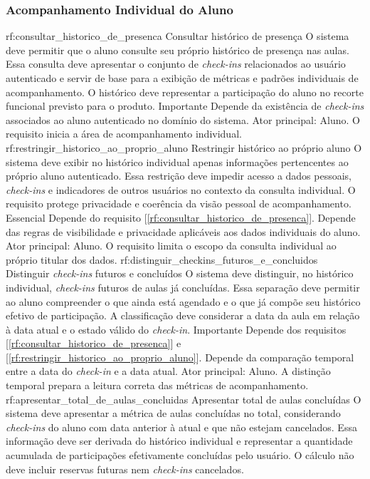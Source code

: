 \subsubsection*{Acompanhamento Individual do Aluno}
\reqfuncfull
{rf:consultar_historico_de_presenca}
{Consultar histórico de presença}
{O sistema deve permitir que o aluno consulte seu próprio histórico de presença nas aulas. Essa consulta deve apresentar o conjunto de \textit{check-ins} relacionados ao usuário autenticado e servir de base para a exibição de métricas e padrões individuais de acompanhamento. O histórico deve representar a participação do aluno no recorte funcional previsto para o produto.}
{Importante}
{Depende da existência de \textit{check-ins} associados ao aluno autenticado no domínio do sistema.}
{Ator principal: Aluno. O requisito inicia a área de acompanhamento individual.}
\reqfuncfull
{rf:restringir_historico_ao_proprio_aluno}
{Restringir histórico ao próprio aluno}
{O sistema deve exibir no histórico individual apenas informações pertencentes ao próprio aluno autenticado. Essa restrição deve impedir acesso a dados pessoais, \textit{check-ins} e indicadores de outros usuários no contexto da consulta individual. O requisito protege privacidade e coerência da visão pessoal de acompanhamento.}
{Essencial}
{Depende do requisito [\ref{rf:consultar_historico_de_presenca}]. Depende das regras de visibilidade e privacidade aplicáveis aos dados individuais do aluno.}
{Ator principal: Aluno. O requisito limita o escopo da consulta individual ao próprio titular dos dados.}
\reqfuncfull
{rf:distinguir_checkins_futuros_e_concluidos}
{Distinguir \textit{check-ins} futuros e concluídos}
{O sistema deve distinguir, no histórico individual, \textit{check-ins} futuros de aulas já concluídas. Essa separação deve permitir ao aluno compreender o que ainda está agendado e o que já compõe seu histórico efetivo de participação. A classificação deve considerar a data da aula em relação à data atual e o estado válido do \textit{check-in}.}
{Importante}
{Depende dos requisitos [\ref{rf:consultar_historico_de_presenca}] e [\ref{rf:restringir_historico_ao_proprio_aluno}]. Depende da comparação temporal entre a data do \textit{check-in} e a data atual.}
{Ator principal: Aluno. A distinção temporal prepara a leitura correta das métricas de acompanhamento.}
\reqfuncfull
{rf:apresentar_total_de_aulas_concluidas}
{Apresentar total de aulas concluídas}
{O sistema deve apresentar a métrica de aulas concluídas no total, considerando \textit{check-ins} do aluno com data anterior à atual e que não estejam cancelados. Essa informação deve ser derivada do histórico individual e representar a quantidade acumulada de participações efetivamente concluídas pelo usuário. O cálculo não deve incluir reservas futuras nem \textit{check-ins} cancelados.}
